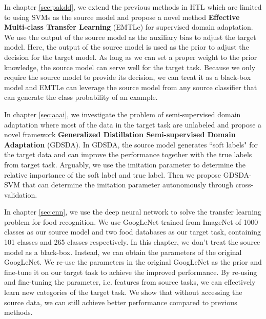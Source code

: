 In chapter \ref{sec:pakdd}, we extend the previous methods in HTL which are limited to using SVMs as the source model and propose a novel method \textbf{Effective Multi-class Transfer Learning} (EMTLe) for supervised domain adaptation. We use the output of the source model as the auxiliary bias to adjust the target model. Here, the output of the source model is used as the prior to adjust the decision for the target model. As long as we can set a proper weight to the prior knowledge, the source model can serve well for the target task. Because we only require the source model to provide its decision, we can treat it as a black-box model and EMTLe can leverage the source model from any source classifier that can generate the class probability of an example.

In chapter \ref{sec:aaai}, we investigate the problem of semi-supervised domain adaptation where most of the data in the target task are unlabeled and propose a novel framework \textbf{Generalized Distillation Semi-supervised Domain Adaptation} (GDSDA). In GDSDA, the source model generates ``soft labels" for the target data and can improve the performance together with the true labels from target task. Arguably, we use the imitation parameter to determine the relative importance of the soft label and true label. Then we propose GDSDA-SVM that can determine the imitation parameter autonomously through cross-validation.

In chapter \ref{sec:cnn}, we use the deep neural network to solve the transfer learning problem for food recognition. We use GoogLeNet trained from ImageNet of 1000 classes as our source model and two food databases as our target task, containing 101 classes and 265 classes respectively. In this chapter, we don't treat the source model as a black-box. Instead, we can obtain the parameters of the original GoogLeNet. We re-use the parameters in the original GoogLeNet as the prior and fine-tune it on our target task to achieve the improved performance. By re-using and fine-tuning the parameter, i.e. features from source tasks, we can effectively learn new categories of the target task. We show that without accessing the source data, we can still achieve better performance compared to previous methods.